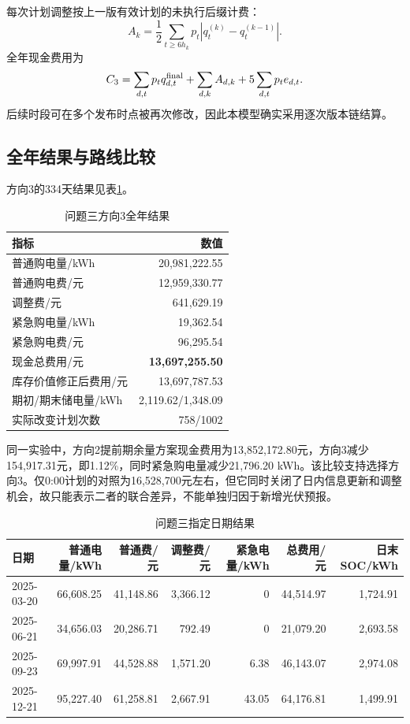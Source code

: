 \documentclass[UTF8,a4paper,12pt]{ctexart}
\begin{document}
每次计划调整按上一版有效计划的未执行后缀计费：
\begin{equation}
 A_k=\frac12\sum_{t\ge6h_k}p_t
 \left|q_t^{(k)}-q_t^{(k-1)}\right|.
\end{equation}
全年现金费用为
\begin{equation}
 C_3=\sum_{d,t}p_tq_{d,t}^{\rm final}
 +\sum_{d,k}A_{d,k}+5\sum_{d,t}p_te_{d,t}.
\end{equation}
后续时段可在多个发布时点被再次修改，因此本模型确实采用逐次版本链结算。

\subsection{全年结果与路线比较}
方向3的334天结果见表\ref{tab:q3-overall-local}。
\begin{table}[H]
\centering\small
\caption{问题三方向3全年结果}\label{tab:q3-overall-local}
\begin{tabular}{lr}
\toprule 指标 & 数值\\ \midrule
普通购电量/kWh & 20,981,222.55\\
普通购电费/元 & 12,959,330.77\\
调整费/元 & 641,629.19\\
紧急购电量/kWh & 19,362.54\\
紧急购电费/元 & 96,295.54\\
现金总费用/元 & \textbf{13,697,255.50}\\
库存价值修正后费用/元 & 13,697,787.53\\
期初/期末储电量/kWh & 2,119.62/1,348.09\\
实际改变计划次数 & 758/1002\\ \bottomrule
\end{tabular}
\end{table}

同一实验中，方向2提前期余量方案现金费用为13,852,172.80元，方向3减少154,917.31元，即1.12\%，同时紧急购电量减少21,796.20 kWh。该比较支持选择方向3。仅0:00计划的对照为16,528,700元左右，但它同时关闭了日内信息更新和调整机会，故只能表示二者的联合差异，不能单独归因于新增光伏预报。

\begin{table}[H]
\centering\scriptsize
\caption{问题三指定日期结果}\label{tab:q3-dates-local}
\begin{tabular}{lrrrrrr}
\toprule 日期 & 普通电量/kWh & 普通费/元 & 调整费/元 & 紧急电量/kWh & 总费用/元 & 日末SOC/kWh\\ \midrule
2025-03-20 & 66,608.25 & 41,148.86 & 3,366.12 & 0 & 44,514.97 & 1,724.91\\
2025-06-21 & 34,656.03 & 20,286.71 & 792.49 & 0 & 21,079.20 & 2,693.58\\
2025-09-23 & 69,997.91 & 44,528.88 & 1,571.20 & 6.38 & 46,143.07 & 2,974.08\\
2025-12-21 & 95,227.40 & 61,258.81 & 2,667.91 & 43.05 & 64,176.81 & 1,499.91\\ \bottomrule
\end{tabular}
\end{table}
\end{document}
